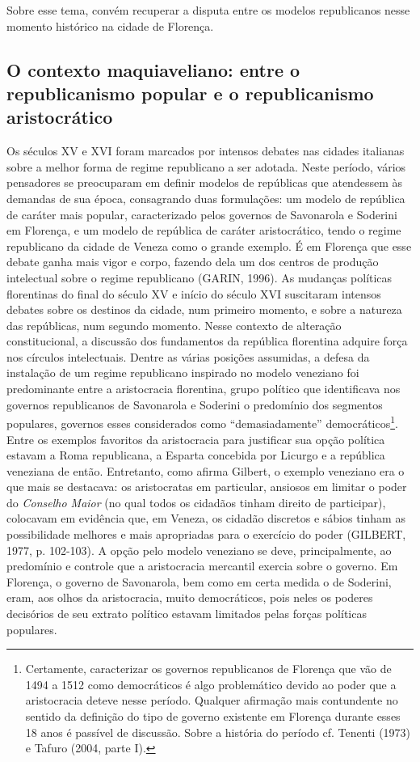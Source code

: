 Sobre esse tema, convém recuperar a disputa entre os modelos
republicanos nesse momento histórico na cidade de Florença.

\subsection{O contexto maquiaveliano: entre o republicanismo popular e o republicanismo aristocrático}

Os séculos XV e XVI foram marcados por intensos debates nas cidades
italianas sobre a melhor forma de regime republicano a ser adotada.
Neste período, vários pensadores se preocuparam em definir modelos de
repúblicas que atendessem às demandas de sua época, consagrando duas
formulações: um modelo de república de caráter mais popular,
caracterizado pelos governos de Savonarola e Soderini em Florença, e um
modelo de república de caráter aristocrático, tendo o regime republicano
da cidade de Veneza como o grande exemplo. É em Florença que esse debate
ganha mais vigor e corpo, fazendo dela um dos centros de produção
intelectual sobre o regime republicano (GARIN, 1996). As mudanças
políticas florentinas do final do século XV e início do século XVI
suscitaram intensos debates sobre os destinos da cidade, num primeiro
momento, e sobre a natureza das repúblicas, num segundo momento. Nesse
contexto de alteração constitucional, a discussão dos fundamentos da
república florentina adquire força nos círculos intelectuais. Dentre as
várias posições assumidas, a defesa da instalação de um regime
republicano inspirado no modelo veneziano foi predominante entre a
aristocracia florentina, grupo político que identificava nos governos
republicanos de Savonarola e Soderini o predomínio dos segmentos
populares, governos esses considerados como ``demasiadamente''
democráticos\footnote{Certamente, caracterizar os governos republicanos
  de Florença que vão de 1494 a 1512 como democráticos é algo
  problemático devido ao poder que a aristocracia deteve nesse período.
  Qualquer afirmação mais contundente no sentido da definição do tipo de
  governo existente em Florença durante esses 18 anos é passível de
  discussão. Sobre a história do período cf. Tenenti (1973) e Tafuro
  (2004, parte I).}. Entre os exemplos favoritos da aristocracia para
justificar sua opção política estavam a Roma republicana, a Esparta
concebida por Licurgo e a república veneziana de então. Entretanto, como
afirma Gilbert, o exemplo veneziano era o que mais se destacava: os
aristocratas em particular, ansiosos em limitar o poder do
\emph{Conselho Maior} (no qual todos os cidadãos tinham direito de
participar), colocavam em evidência que, em Veneza, os cidadão discretos
e sábios tinham as possibilidade melhores e mais apropriadas para o
exercício do poder (GILBERT, 1977, p. 102-103). A opção pelo modelo
veneziano se deve, principalmente, ao predomínio e controle que a
aristocracia mercantil exercia sobre o governo. Em Florença, o governo
de Savonarola, bem como em certa medida o de Soderini, eram, aos olhos
da aristocracia, muito democráticos, pois neles os poderes decisórios de
seu extrato político estavam limitados pelas forças políticas populares.

